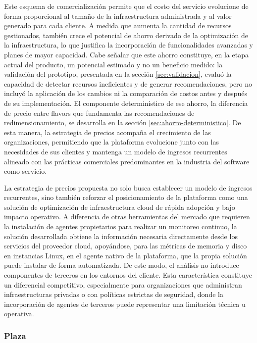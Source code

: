Este esquema de comercialización permite que el costo del servicio evolucione de forma proporcional al tamaño de la infraestructura administrada y al valor generado para cada cliente. A medida que aumenta la cantidad de recursos gestionados, también crece el potencial de ahorro derivado de la optimización de la infraestructura, lo que justifica la incorporación de funcionalidades avanzadas y planes de mayor capacidad. Cabe señalar que este ahorro constituye, en la etapa actual del producto, un potencial estimado y no un beneficio medido: la validación del prototipo, presentada en la sección \ref{sec:validacion}, evaluó la capacidad de detectar recursos ineficientes y de generar recomendaciones, pero no incluyó la aplicación de los cambios ni la comparación de costos antes y después de su implementación. El componente determinístico de ese ahorro, la diferencia de precio entre flavors que fundamenta las recomendaciones de redimensionamiento, se desarrolla en la sección \ref{sec:ahorro-deterministico}. De esta manera, la estrategia de precios acompaña el crecimiento de las organizaciones, permitiendo que la plataforma evolucione junto con las necesidades de sus clientes y mantenga un modelo de ingresos recurrentes alineado con las prácticas comerciales predominantes en la industria del software como servicio.

La estrategia de precios propuesta no solo busca establecer un modelo de ingresos recurrentes, sino también reforzar el posicionamiento de la plataforma como una solución de optimización de infraestructura cloud de rápida adopción y bajo impacto operativo. A diferencia de otras herramientas del mercado que requieren la instalación de agentes propietarios para realizar un monitoreo continuo, la solución desarrollada obtiene la información necesaria directamente desde los servicios del proveedor cloud, apoyándose, para las métricas de memoria y disco en instancias Linux, en el agente nativo de la plataforma, que la propia solución puede instalar de forma automatizada. De este modo, el análisis no introduce componentes de terceros en los entornos del cliente. Esta característica constituye un diferencial competitivo, especialmente para organizaciones que administran infraestructuras privadas o con políticas estrictas de seguridad, donde la incorporación de agentes de terceros puede representar una limitación técnica u operativa.

\subsubsection{Plaza}

